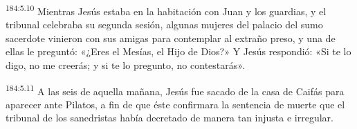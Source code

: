 \par 
\textsuperscript{184:5.10} Mientras Jesús estaba en la habitación con Juan y los guardias, y el tribunal celebraba su segunda sesión, algunas mujeres del palacio del sumo sacerdote vinieron con sus amigas para contemplar al extraño preso, y una de ellas le preguntó: «¿Eres el Mesías, el Hijo de Dios?» Y Jesús respondió: «Si te lo digo, no me creerás; y si te lo pregunto, no contestarás».

\par 
\textsuperscript{184:5.11} A las seis de aquella mañana, Jesús fue sacado de la casa de Caifás para aparecer ante Pilatos, a fin de que éste confirmara la sentencia de muerte que el tribunal de los sanedristas había decretado de manera tan injusta e irregular.
